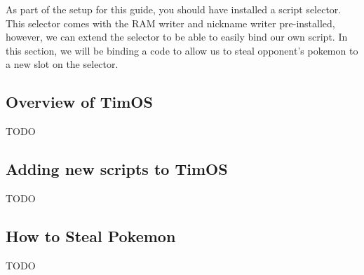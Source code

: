 \documentclass[../main.tex]{subfiles}
\begin{document}
    As part of the setup for this guide, you should have installed a script selector.  This selector comes with the RAM writer and nickname writer pre-installed, however, we can extend the selector to be able to easily bind our own script.  In this section, we will be binding a code to allow us to steal opponent's pokemon to a new slot on the selector.

    \subsection{Overview of TimOS}
    TODO

    \subsection{Adding new scripts to TimOS}
    TODO

    \subsection{How to Steal Pokemon}
    TODO
\end{document}

